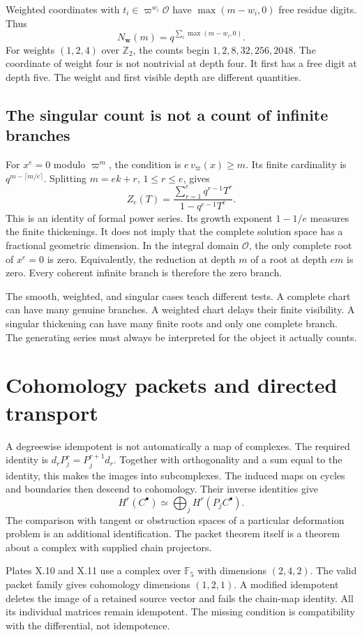 Weighted coordinates with $t_i\in\varpi^{w_i}\mathcal O$ have
$\max(m-w_i,0)$ free residue digits. Thus
\[
 N_{\symbf{w}}(m)=q^{\sum_i\max(m-w_i,0)}.
\]
For weights $(1,2,4)$ over $\mathbb Z_2$, the counts begin
$1,2,8,32,256,2048$. The coordinate of weight four is not nontrivial at depth
four. It first has a free digit at depth five. The weight and first visible depth
are different quantities.

\subsection{The singular count is not a count of infinite branches}
For $x^e=0$ modulo $\varpi^m$, the condition is
$e\,v_\varpi(x)\ge m$. Its finite cardinality is
$q^{m-\lceil m/e\rceil}$. Splitting $m=ek+r$, $1\le r\le e$, gives
\[
 Z_e(T)=\frac{\sum_{r=1}^{e}q^{r-1}T^r}{1-q^{e-1}T^e}.
\]
This is an identity of formal power series. Its growth exponent $1-1/e$
measures the finite thickenings. It does not imply that the complete solution
space has a fractional geometric dimension. In the integral domain
$\mathcal O$, the only complete root of $x^e=0$ is zero. Equivalently, the
reduction at depth $m$ of a root at depth $em$ is zero. Every coherent infinite
branch is therefore the zero branch.

The smooth, weighted, and singular cases teach different tests. A complete chart
can have many genuine branches. A weighted chart delays their finite visibility.
A singular thickening can have many finite roots and only one complete branch.
The generating series must always be interpreted for the object it actually counts.

\clearpage
\section{Cohomology packets and directed transport}
A degreewise idempotent is not automatically a map of complexes. The required
identity is $d_rP_j^r=P_j^{r+1}d_r$. Together with orthogonality and a sum equal
to the identity, this makes the images into subcomplexes. The induced maps on
cycles and boundaries then descend to cohomology. Their inverse identities give
\[
 H^r(C^\bullet)\simeq\bigoplus_j H^r(P_jC^\bullet).
\]
The comparison with tangent or obstruction spaces of a particular deformation
problem is an additional identification. The packet theorem itself is a theorem
about a complex with supplied chain projectors.

Plates X.10 and X.11 use a complex over $\mathbb F_5$ with dimensions $(2,4,2)$.
The valid packet family gives cohomology dimensions $(1,2,1)$. A modified
idempotent deletes the image of a retained source vector and fails the chain-map
identity. All its individual matrices remain idempotent. The missing condition
is compatibility with the differential, not idempotence.

